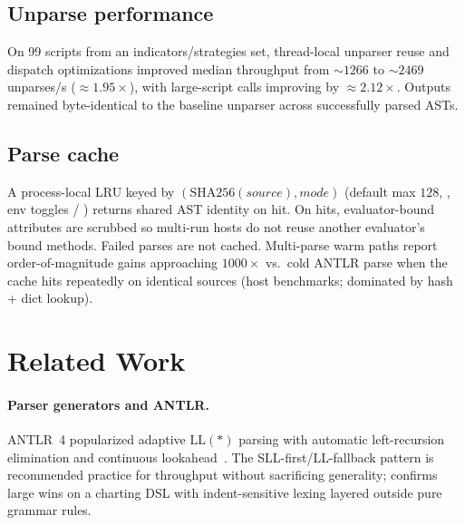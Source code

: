 \documentclass[11pt,a4paper]{article}
\begin{document}
\subsection{Unparse performance}
\label{sec:eval-unparse}

On 99 scripts from an indicators/strategies set, thread-local unparser reuse and
dispatch optimizations improved median throughput from \(\sim 1266\) to
\(\sim 2469\) unparses/s (\(\approx 1.95\times\)), with large-script calls
improving by \(\approx 2.12\times\). Outputs remained byte-identical to the
baseline unparser across successfully parsed ASTs.

\subsection{Parse cache}
\label{sec:eval-cache}

A process-local LRU keyed by \((\mathrm{SHA256}(\mathit{source}), \mathit{mode})\)
(default max \(128\), , env toggles
 / ) returns shared AST
identity on hit. On hits, evaluator-bound  attributes
are scrubbed so multi-run hosts do not reuse another evaluator's bound methods.
Failed parses are not cached. Multi-parse warm paths report order-of-magnitude
gains approaching \(1000\times\) vs.\ cold ANTLR parse when the cache hits
repeatedly on identical sources (host benchmarks; dominated by hash + dict
lookup).

\section{Related Work}
\label{sec:related}

\paragraph{Parser generators and ANTLR.}
ANTLR~4 popularized adaptive \(\mathrm{LL}(*)\) parsing with automatic
left-recursion elimination and continuous lookahead~\citep{parr2013antlr,parr2011allstar,parr1995antlr}.
The SLL-first/LL-fallback pattern is recommended practice for throughput without
sacrificing generality; \pyne{} confirms large wins on a charting DSL with
indent-sensitive lexing layered outside pure grammar rules.
\end{document}

